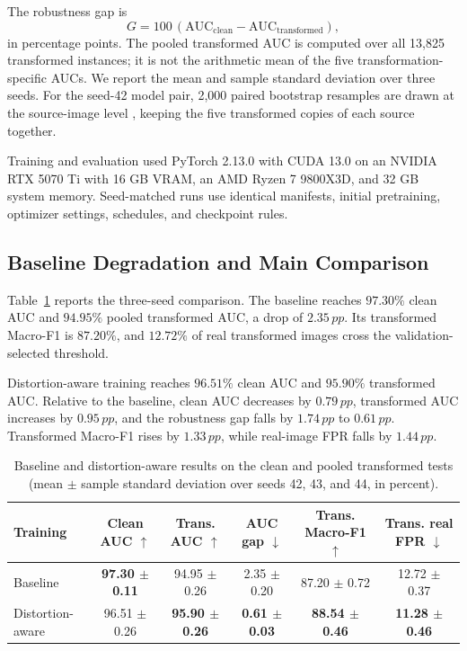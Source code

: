 \documentclass[conference]{IEEEtran}
\newcommand{\pp}{\,pp}
\begin{document}
The robustness gap is
\begin{equation}
G=100\,(\mathrm{AUC}_{\mathrm{clean}}-
\mathrm{AUC}_{\mathrm{transformed}}),
\label{eq:gap}
\end{equation}
in percentage points. The pooled transformed AUC is computed over all 13,825
transformed instances; it is not the arithmetic mean of the five
transformation-specific AUCs. We report the mean and sample standard deviation
over three seeds. For the seed-42 model pair, 2,000 paired bootstrap resamples
are drawn at the source-image level \cite{efron1979bootstrap}, keeping the five
transformed copies of each source together.

Training and evaluation used PyTorch 2.13.0 with CUDA 13.0 on an NVIDIA RTX
5070 Ti with 16 GB VRAM, an AMD Ryzen 7 9800X3D, and 32 GB system memory.
Seed-matched runs use identical manifests, initial pretraining, optimizer
settings, schedules, and checkpoint rules.

\subsection{Baseline Degradation and Main Comparison}

Table~\ref{tab:main} reports the three-seed comparison. The baseline reaches
$97.30\%$ clean AUC and $94.95\%$ pooled transformed AUC, a drop of
$2.35\pp$. Its transformed Macro-F1 is $87.20\%$, and $12.72\%$ of real
transformed images cross the validation-selected threshold.

Distortion-aware training reaches $96.51\%$ clean AUC and $95.90\%$
transformed AUC. Relative to the baseline, clean AUC decreases by $0.79\pp$,
transformed AUC increases by $0.95\pp$, and the robustness gap falls by
$1.74\pp$ to $0.61\pp$. Transformed Macro-F1 rises by $1.33\pp$, while real-image FPR falls
by $1.44\pp$.

\begin{table}[!t]
\centering
\caption{Baseline and distortion-aware results on the clean and pooled
transformed tests (mean $\pm$ sample standard deviation over seeds 42, 43,
and 44, in percent).}
\label{tab:main}
\setlength{\tabcolsep}{7pt}
\begin{tabular}{lccccc}
\toprule
Training & Clean AUC $\uparrow$ & Trans. AUC $\uparrow$ & AUC gap $\downarrow$ &
Trans. Macro-F1 $\uparrow$ & Trans. real FPR $\downarrow$ \\
\midrule
Baseline & \textbf{97.30 $\pm$ 0.11} & 94.95 $\pm$ 0.26 & 2.35 $\pm$ 0.20 &
87.20 $\pm$ 0.72 & 12.72 $\pm$ 0.37 \\
Distortion-aware & 96.51 $\pm$ 0.26 & \textbf{95.90 $\pm$ 0.26} &
\textbf{0.61 $\pm$ 0.03} & \textbf{88.54 $\pm$ 0.46} &
\textbf{11.28 $\pm$ 0.46} \\
\bottomrule
\end{tabular}
\end{table}
\end{document}
